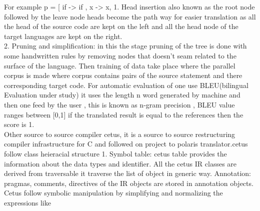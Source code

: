 \documentclass[23pt]{article}
\begin{document}
{For example p = [ if -> if , x -> x, %
1. Head insertion also known as the root node followed by the leave node heads become the path way for easier translation as all the head of the source code are kept on the left and all the head node of the target languages are kept on the right. \\
 2. Pruning and simplification: in this the stage pruning of the tree is done with some handwritten rules by removing nodes that doesn’t seam related to the surface of the language. Then training of data take place where the parallel corpus is made where corpus contains pairs of the source statement and there corresponding target code. For automatic evaluation of one use BLEU(bilingual Evaluation under study) it uses the length n word generated by machine and then one feed by the user , this is known as n-gram precision , BLEU value ranges between [0,1]  if the translated result is equal to the references then the score is 1. \\
Other source to source compiler cetus, it is a source to source restructuring compiler infrastructure for C and followed on project to polaris translator.cetus follow class heieracial structure  1. Symbol table: cetus table provides the information about the data types and identifier. All the cetus  IR classes are derived from traversable it traverse the list of object in generic way. Annotation:  pragmas, comments, directives of the IR objects are stored in annotation objects.
Cetus follow symbolic manipulation by simplifying and normalizing the expressions like 
}
\end{document}
